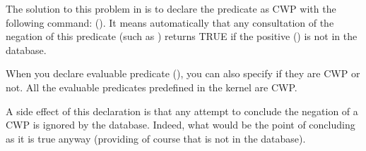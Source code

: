 The solution to this problem in \CPK{} is to declare the predicate
 as CWP with the following command:  (). It means
automatically that any consultation of the negation of this predicate
(such as ) returns TRUE if the
positive () is not in the database.

When you declare evaluable predicate (), you
can also specify if they are CWP or not. All the evaluable predicates
predefined in the kernel are CWP.

A side effect of this declaration is that any attempt to conclude the
negation of a CWP is ignored by the database. Indeed, what would be
the point of concluding  as it is true
anyway (providing of course that  is not in the database).

